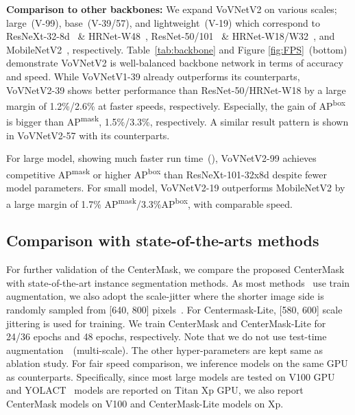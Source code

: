 \documentclass[10pt,twocolumn,letterpaper]{article}
\begin{document}
\noindent
\textbf{Comparison to other backbones:}
We expand VoVNetV2 on various scales; large~(V-99), base~(V-39/57), and lightweight~(V-19) which correspond to ResNeXt-32-8d~\cite{xie2017aggregated} \& HRNet-W48~\cite{sun2019high}, ResNet-50/101~\cite{he2016deep} \& HRNet-W18/W32~\cite{sun2019high}, and MobileNetV2~\cite{sandler2018mobilenetv2}, respectively.
Table~\ref{tab:backbone} and Figure \ref{fig:FPS}~(bottom) demonstrate VoVNetV2 is well-balanced backbone network in terms of accuracy and speed.
While VoVNetV1-39 already outperforms its counterparts, VoVNetV2-39 shows better performance than ResNet-50/HRNet-W18 by a large margin of 1.2\%/2.6\% at faster speeds, respectively.
Especially, the gain of AP\textsuperscript{box} is bigger than AP\textsuperscript{mask}, 1.5\%/3.3\%, respectively.
A similar result pattern is shown in VoVNetV2-57 with its counterparts.

For large model, showing much faster run time~(), VoVNetV2-99 achieves competitive AP\textsuperscript{mask} or higher AP\textsuperscript{box} than ResNeXt-101-32x8d despite fewer model parameters.
For small model, VoVNetV2-19 outperforms MobileNetV2 by a large margin of 1.7\% AP\textsuperscript{mask}/3.3\%AP\textsuperscript{box}, with comparable speed.






\subsection{Comparison with state-of-the-arts methods}\label{sec:SOTA}
For further validation of the CenterMask, we compare the proposed CenterMask with state-of-the-art instance segmentation methods.
As most methods~\cite{liu2016ssd,Chen_2019_ICCV,He_2019_ICCV,Bolya_2019_ICCV,fu2019retinamask} use train augmentation, we also adopt the scale-jitter where the shorter image side is randomly sampled from [640, 800] pixels~\cite{He_2019_ICCV}. For Centermask-Lite, [580, 600] scale jittering is used for training.
We train CenterMask and CenterMask-Lite for 24/36 epochs and 48 epochs, respectively.
Note that we do not use test-time augmentation~\cite{He_2019_ICCV}~(multi-scale).
The other hyper-parameters are kept same as ablation study.
For fair speed comparison, we inference models on the same GPU as counterparts.
Specifically, since most large models are tested on V100 GPU and YOLACT~\cite{Bolya_2019_ICCV} models are reported on Titan Xp GPU, we also report CenterMask models on V100 and CenterMask-Lite models on Xp.
\end{document}

